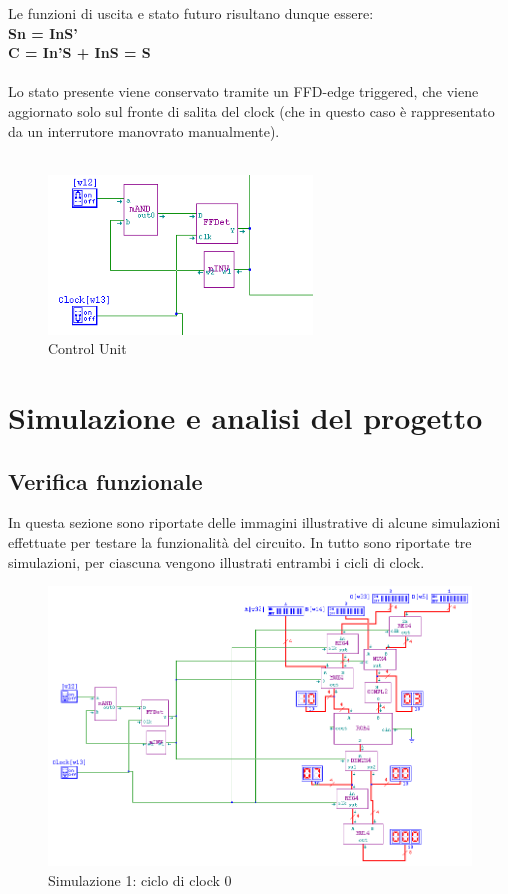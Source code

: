 \documentclass[10pt]{article}
\begin{document}
\begin{itemize}
Le funzioni di uscita e stato futuro risultano dunque essere:
\\
\textbf{Sn = InS'}\\ 
\textbf{C = In'S + InS = S}
\\
\\
Lo stato presente viene conservato tramite un FFD-edge triggered,
che viene aggiornato solo sul fronte di salita del clock (che in questo caso è rappresentato da un interrutore manovrato manualmente). 
\\
\\
\begin{figure}[ht]
    \begin{minipage}[c]{\textwidth}
    \centering
    \includegraphics[width=70mm]{cu}
    \caption{Control Unit}
    \label{ }
    \end{minipage}
\end{figure}

\newpage

\section{Simulazione e analisi del progetto}
\subsection{Verifica funzionale}
In questa sezione sono riportate delle immagini illustrative di alcune simulazioni effettuate per testare la funzionalità del circuito. In tutto sono riportate tre simulazioni, per ciascuna vengono 
illustrati entrambi i cicli di clock.

\begin{figure}[H]
    \begin{minipage}[c]{\textwidth}
    \centering    
    \includegraphics[width=\textwidth]{s1c0}
    \caption{Simulazione 1: ciclo di clock 0}
    \label{ }
    \end{minipage}
\end{figure}


\end{itemize}
\end{document}

